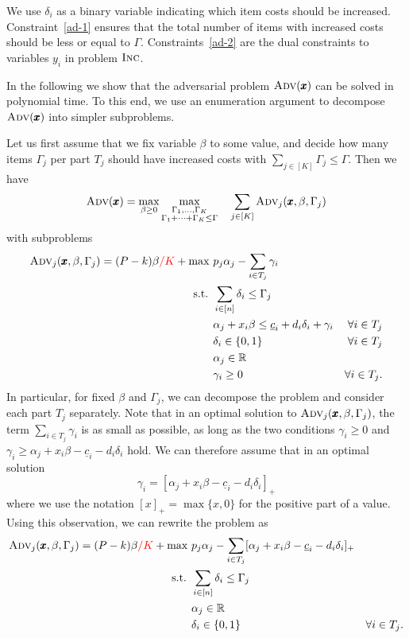 \documentclass[a4paper,11pt,abstracton]{scrartcl}
\theoremstyle{definition}
\theoremstyle{remark}
\newcommand{\rr}{\mathbb{R}}
\newcommand{\lasse}[1]{\textcolor{red}{#1}}
\begin{document}
We use $\delta_i$ as a binary variable indicating which item costs should be increased. Constraint~\eqref{ad-1} ensures that the total number of items with increased costs should be less or equal to $\Gamma$. Constraints~\eqref{ad-2} are the dual constraints to variables $y_i$ in problem $\textsc{Inc}$.

In the following we show that {the adversarial problem $\textsc{Adv}(\pmb{x})$} can be solved in polynomial time. To this end, we use an enumeration argument to decompose {$\textsc{Adv}(\pmb{x})$} into simpler subproblems.

Let us first assume that we fix variable $\beta$ to some value, and decide how many items $\Gamma_j$ per part $T_j$ should have increased costs with $\sum_{j\in[K]} \Gamma_j \le \Gamma$. Then we have
\[ \textsc{Adv}(\pmb{x}) = \max_{{\beta \ge 0}} \max_{\substack{\Gamma_1,\ldots,\Gamma_K\\ \Gamma_1 + \dots + \Gamma_K \leq \Gamma}} \quad \sum_{j\in[K]} \textsc{Adv}_j(\pmb{x},\beta,\Gamma_j) \]
with subproblems
\begin{align*}
\textsc{Adv}_j(\pmb{x},\beta,\Gamma_j) = (P-k)\beta\lasse{/K} + \max\ &  p_j \alpha_j - \sum_{i\in T_j} \gamma_i \\
\text{s.t. } & \sum_{i\in[n]} \delta_i \le \Gamma_j \\
& \alpha_j + x_i \beta \le \underline{c}_i + d_i\delta_i + \gamma_i & \forall i\in T_j \\
& \delta_i\in\{0,1\} & \forall i\in T_j \\
& \alpha_j \in \rr \\
& \gamma_i \ge 0 & \forall i\in T_j.
\end{align*}
In particular, for fixed $\beta$ and $\Gamma_j$, we can decompose the problem and consider each part $T_j$ separately. Note that in an optimal solution to $\textsc{Adv}_j(\pmb{x},\beta,\Gamma_j)$, the term $\sum_{i\in T_j} \gamma_i$ is as small as possible, as long as the two conditions $\gamma_i \geq 0$ and $\gamma_i \geq \alpha_j + x_i \beta - \underline{c}_i - d_i\delta_i$ hold. We can therefore assume that in an optimal solution
\[ \gamma_i = [\alpha_j + x_i \beta - \underline{c}_i - d_i\delta_i ]_+ \]
where we use the notation $[x]_+ = \max\{x,0\}$ for the positive part of a value. Using this observation, we can rewrite the problem as 
\begin{subequations}
\label{eq:a}  
\begin{align}
\textsc{Adv}_j(\pmb{x},\beta,\Gamma_j) = (P-k)\beta \lasse{/K} + \max\ &  p_j \alpha_j - \sum_{i\in T_j} [\alpha_j + x_i \beta - \underline{c}_i - d_i\delta_i]_+ \label{a-0} \\
\text{s.t. } & \sum_{i\in[n]} \delta_i \le \Gamma_j \label{a-1}\\
& \alpha_j \in \rr \\
& \delta_i\in\{0,1\} & \forall i\in T_j. \label{a-2}
\end{align}
\end{subequations}
\end{document}
